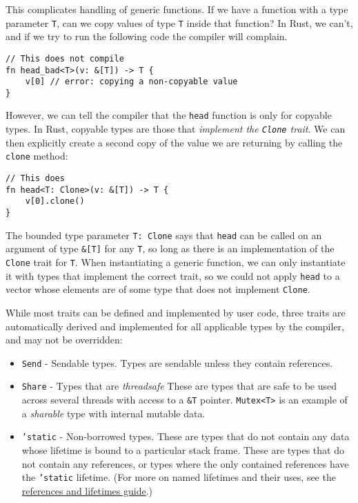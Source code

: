 \documentclass[]{article}
\begin{document}
This complicates handling of generic functions. If we have a function
with a type parameter \texttt{T}, can we copy values of type \texttt{T}
inside that function? In Rust, we can't, and if we try to run the
following code the compiler will complain.

\begin{verbatim}
// This does not compile
fn head_bad<T>(v: &[T]) -> T {
    v[0] // error: copying a non-copyable value
}
\end{verbatim}

However, we can tell the compiler that the \texttt{head} function is
only for copyable types. In Rust, copyable types are those that
\emph{implement the \texttt{Clone} trait}. We can then explicitly create
a second copy of the value we are returning by calling the
\texttt{clone} method:

\begin{verbatim}
// This does
fn head<T: Clone>(v: &[T]) -> T {
    v[0].clone()
}
\end{verbatim}

The bounded type parameter \texttt{T: Clone} says that \texttt{head} can
be called on an argument of type \texttt{\&{[}T{]}} for any \texttt{T},
so long as there is an implementation of the \texttt{Clone} trait for
\texttt{T}. When instantiating a generic function, we can only
instantiate it with types that implement the correct trait, so we could
not apply \texttt{head} to a vector whose elements are of some type that
does not implement \texttt{Clone}.

While most traits can be defined and implemented by user code, three
traits are automatically derived and implemented for all applicable
types by the compiler, and may not be overridden:

\begin{itemize}
\item
  \texttt{Send} - Sendable types. Types are sendable unless they contain
  references.
\item
  \texttt{Share} - Types that are \emph{threadsafe} These are types that
  are safe to be used across several threads with access to a
  \texttt{\&T} pointer. \texttt{Mutex\textless{}T\textgreater{}} is an
  example of a \emph{sharable} type with internal mutable data.
\item
  \texttt{'static} - Non-borrowed types. These are types that do not
  contain any data whose lifetime is bound to a particular stack frame.
  These are types that do not contain any references, or types where the
  only contained references have the \texttt{'static} lifetime. (For
  more on named lifetimes and their uses, see the
  \href{guide-lifetimes.html}{references and lifetimes guide}.)
\end{itemize}
\end{document}
